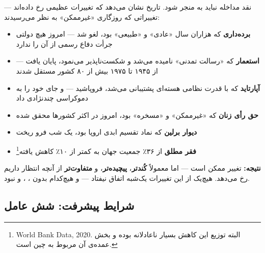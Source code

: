 \begin{tcolorbox}[successbox, title={تاریخ پیشرفت — با همه‌ی عقب‌گردها}]
نقد مداخله نباید به  منجر شود. تاریخ نشان می‌دهد که
تغییرات عظیمی رخ داده‌اند — تغییراتی که روزگاری «غیرممکن» به نظر
می‌رسیدند:

\begin{itemize}
\item \textbf{برده‌داری} که هزاران سال «عادی» و «طبیعی» بود، لغو شد
  — امروز هیچ دولتی جرأت دفاع رسمی از آن را ندارد
\item \textbf{استعمار} که «رسالت تمدنی» نامیده می‌شد و شکست‌ناپذیر
  می‌نمود، پایان یافت — از ۱۹۴۵ تا ۱۹۷۵ بیش از ۸۰ کشور مستقل شدند
\item \textbf{آپارتاید} که با قدرت نظامی هسته‌ای پشتیبانی می‌شد،
  فروپاشید — و جای خود را به دموکراسی چندنژادی داد
\item \textbf{حق رأی زنان} که «غیرممکن» و «مسخره» بود، امروز در اکثر
  کشورها محقق شده
\item \textbf{دیوار برلین} که نماد تقسیم ابدی اروپا بود، یک شب فرو ریخت
\item \textbf{فقر مطلق} از ۳۶٪ جمعیت جهان  به کمتر از ۱۰٪
   کاهش یافته\footnote{World Bank Data, 2020.
  البته توزیع این کاهش بسیار ناعادلانه بوده و بخش عمده‌ی آن مربوط به
  چین است.}
\end{itemize}

\textbf{نتیجه:} تغییر ممکن است — اما معمولاً \textbf{کُندتر}،
\textbf{پیچیده‌تر}، و \textbf{متفاوت‌تر} از آنچه انتظار داریم رخ می‌دهد.
هیچ‌یک از این تغییرات یک‌شبه اتفاق نیفتاد — و هیچ‌کدام بدون
، ، و  نبود.
\end{tcolorbox}


\subsection{شرایط پیشرفت: شش عامل}

